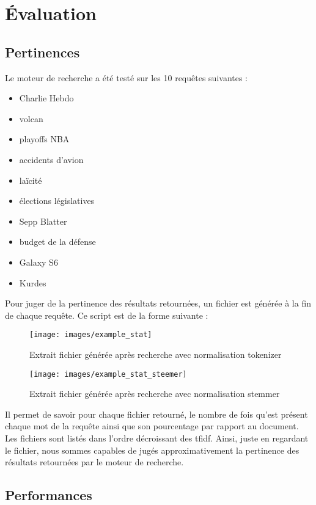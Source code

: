 \section{Évaluation}
\subsection{Pertinences}

Le moteur de recherche a été testé sur les 10 requêtes suivantes : 
\begin{multicols}{2}
	\begin{itemize}
		\item Charlie Hebdo
		\item volcan
		\item playoffs NBA
		\item accidents d'avion
		\item laïcité
		\item élections législatives
		\item Sepp Blatter
		\item  budget de la défense
		\item Galaxy S6
		\item Kurdes
	\end{itemize}
\end{multicols}


Pour juger de la pertinence des résultats retournées, un fichier est générée à la fin de chaque requête. Ce script est de la forme suivante :

\begin{figure}[H]
	\centering
	\texttt{[image: images/example\_stat]}
	\caption{Extrait fichier générée après recherche avec normalisation tokenizer}
	\label{fig:example_stat_tokenizer}
\end{figure}
\begin{figure}[H]
	\centering
	\texttt{[image: images/example\_stat\_steemer]}
	\caption{Extrait fichier générée après recherche avec normalisation stemmer}
	\label{fig:example_stat_stemmer}
\end{figure}

Il permet de savoir pour chaque fichier retourné, le nombre de fois qu'est présent chaque mot de la requête ainsi que son pourcentage par rapport au document. Les fichiers sont listés dans l'ordre décroissant des tfidf. Ainsi, juste en regardant le fichier, nous sommes capables de jugés approximativement la pertinence des résultats retournées par le moteur de recherche.

\subsection{Performances}
